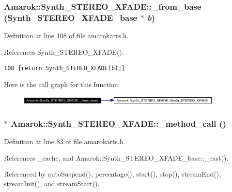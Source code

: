 \subsubsection{ Amarok::Synth\_\-STEREO\_\-XFADE::\_\-from\_\-base ({\bf Synth\_\-STEREO\_\-XFADE\_\-base} $\ast$ {\em b})\hspace{0.3cm}{\tt  [inline, static]}}\label{classAmarok_1_1Synth__STEREO__XFADE_Amarok_1_1Synth__STEREO__XFADEe1}




Definition at line 108 of file amarokarts.h.

References Synth\_\-STEREO\_\-XFADE().



\footnotesize\begin{verbatim}108 {return Synth_STEREO_XFADE(b);}
\end{verbatim}\normalsize 


Here is the call graph for this function:\begin{figure}[H]
\begin{center}
\leavevmode
\includegraphics[width=293pt]{classAmarok_1_1Synth__STEREO__XFADE_Amarok_1_1Synth__STEREO__XFADEe1_cgraph}
\end{center}
\end{figure}
\subsubsection{$\ast$ Amarok::Synth\_\-STEREO\_\-XFADE::\_\-method\_\-call ()\hspace{0.3cm}{\tt  [inline, private]}}\label{classAmarok_1_1Synth__STEREO__XFADE_Amarok_1_1Synth__STEREO__XFADEd0}




Definition at line 83 of file amarokarts.h.

References \_\-cache, and Amarok::Synth\_\-STEREO\_\-XFADE\_\-base::\_\-cast().

Referenced by auto\-Suspend(), percentage(), start(), stop(), stream\-End(), stream\-Init(), and stream\-Start().



